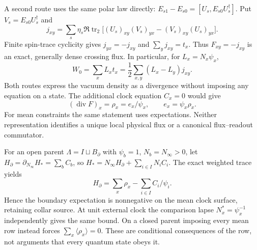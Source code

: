 \documentclass[10pt]{article}
\begin{document}
A second route uses the same polar law directly:
$E_{s1}-E_{s0}=[U_s,E_{s0}U_s^\dagger]$. Put $V_s=E_{s0}U_s^\dagger$
and
\[
 j_{xy}=\sum_s\eta_s\Re\operatorname{tr}_2
       \bigl[(U_s)_{xy}(V_s)_{yx}-(V_s)_{xy}(U_s)_{yx}\bigr].
\]
Finite spin-trace cyclicity gives $j_{yx}=-j_{xy}$ and
$\sum_yj_{xy}=t_x$. Thus $F_{xy}=-j_{xy}$ is an exact, generally
dense crossing flux. In particular, for $L_x=N_x\psi_x$,
\[
 W_0=\sum_xL_xt_x=\frac12\sum_{x,y}(L_x-L_y)j_{xy}.
\]
Both routes express the vacuum density as a divergence without
imposing any equation on a state. The additional clock equation
$C_x=0$ would give
\begin{equation}
 (\operatorname{div}F)_x=\rho_x=e_x/\psi_x,
 \qquad e_x=\psi_x\rho_x.
 \label{eq:fg-gauss}
\end{equation}
For mean constraints the same statement uses expectations. Neither
representation identifies a unique local physical flux or a
canonical flux--readout commutator.

For an open parent $\Lambda=I\sqcup B_\partial$ with
$\psi_b=1$, $N_b=N_\infty>0$, let
$H_\partial=\partial_{N_\infty}H_*=\sum_bC_b$, so
$H_*=N_\infty H_\partial+\sum_{i\in I}N_iC_i$.
The exact weighted trace yields
\[
 H_\partial=\sum_x\rho_x-\sum_{i\in I}C_i/\psi_i.
\]
Hence the boundary expectation is nonnegative on the mean clock
surface, retaining collar source. At unit external clock the
comparison lapse $N_x^*=\psi_x^{-1}$ independently gives the same
bound. On a closed parent imposing every mean row instead forces
$\sum_x\langle\rho_x\rangle=0$. These are conditional consequences
of the row, not arguments that every quantum state obeys it.
\end{document}
